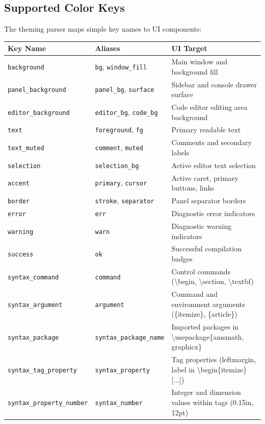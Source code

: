 \documentclass[11pt, a4paper]{article}
\begin{document}
\subsection{Supported Color Keys}
The theming parser maps simple key names to UI components:
\begin{table}[htbp]
\centering
\begin{tabular}{lll}
\toprule
\textbf{Key Name} & \textbf{Aliases} & \textbf{UI Target} \\
\midrule
\texttt{background} & \texttt{bg}, \texttt{window\_fill} & Main window and background fill \\
\texttt{panel\_background} & \texttt{panel\_bg}, \texttt{surface} & Sidebar and console drawer surface \\
\texttt{editor\_background} & \texttt{editor\_bg}, \texttt{code\_bg} & Code editor editing area background \\
\texttt{text} & \texttt{foreground}, \texttt{fg} & Primary readable text \\
\texttt{text\_muted} & \texttt{comment}, \texttt{muted} & Comments and secondary labels \\
\texttt{selection} & \texttt{selection\_bg} & Active editor text selection \\
\texttt{accent} & \texttt{primary}, \texttt{cursor} & Active caret, primary buttons, links \\
\texttt{border} & \texttt{stroke}, \texttt{separator} & Panel separator borders \\
\texttt{error} & \texttt{err} & Diagnostic error indicators \\
\texttt{warning} & \texttt{warn} & Diagnostic warning indicators \\
\texttt{success} & \texttt{ok} & Successful compilation badges \\
\midrule
\texttt{syntax\_command} & \texttt{command} & Control commands (\textbackslash begin, \textbackslash section, \textbackslash textbf) \\
\texttt{syntax\_argument} & \texttt{argument} & Command and environment arguments (\{itemize\}, \{article\}) \\
\texttt{syntax\_package} & \texttt{syntax\_package\_name} & Imported packages in \textbackslash usepackage\{amsmath, graphicx\} \\
\texttt{syntax\_tag\_property} & \texttt{syntax\_property} & Tag properties (leftmargin, label in \textbackslash begin\{itemize\}[...]) \\
\texttt{syntax\_property\_number} & \texttt{syntax\_number} & Integer and dimension values within tags (0.15in, 12pt) \\

\end{tabular}
\end{table}
\end{document}
